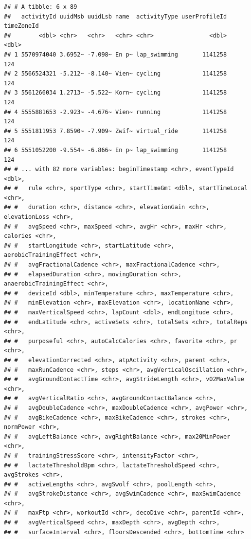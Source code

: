 \documentclass[
]{book}
\newenvironment{Shaded}{\begin{snugshade}}{\end{snugshade}}
\newcommand{\KeywordTok}[1]{\textcolor[rgb]{0.13,0.29,0.53}{\textbf{#1}}}
\newcommand{\NormalTok}[1]{#1}
\newcommand{\OperatorTok}[1]{\textcolor[rgb]{0.81,0.36,0.00}{\textbf{#1}}}
\newcommand{\StringTok}[1]{\textcolor[rgb]{0.31,0.60,0.02}{#1}}
\begin{document}
\begin{Shaded}
\end{Shaded}

\begin{verbatim}
## # A tibble: 6 x 89
##   activityId uuidMsb uuidLsb name  activityType userProfileId timeZoneId
##        <dbl> <chr>   <chr>   <chr> <chr>                <dbl>      <dbl>
## 1 5570974040 3.6952~ -7.098~ En p~ lap_swimming       1141258        124
## 2 5566524321 -5.212~ -8.140~ Vien~ cycling            1141258        124
## 3 5561266034 1.2713~ -5.522~ Korn~ cycling            1141258        124
## 4 5555881653 -2.923~ -4.676~ Vien~ running            1141258        124
## 5 5551811953 7.8590~ -7.909~ Zwif~ virtual_ride       1141258        124
## 6 5551052200 -9.554~ -6.866~ En p~ lap_swimming       1141258        124
## # ... with 82 more variables: beginTimestamp <chr>, eventTypeId <dbl>,
## #   rule <chr>, sportType <chr>, startTimeGmt <dbl>, startTimeLocal <chr>,
## #   duration <chr>, distance <chr>, elevationGain <chr>, elevationLoss <chr>,
## #   avgSpeed <chr>, maxSpeed <chr>, avgHr <chr>, maxHr <chr>, calories <chr>,
## #   startLongitude <chr>, startLatitude <chr>, aerobicTrainingEffect <chr>,
## #   avgFractionalCadence <chr>, maxFractionalCadence <chr>,
## #   elapsedDuration <chr>, movingDuration <chr>, anaerobicTrainingEffect <chr>,
## #   deviceId <dbl>, minTemperature <chr>, maxTemperature <chr>,
## #   minElevation <chr>, maxElevation <chr>, locationName <chr>,
## #   maxVerticalSpeed <chr>, lapCount <dbl>, endLongitude <chr>,
## #   endLatitude <chr>, activeSets <chr>, totalSets <chr>, totalReps <chr>,
## #   purposeful <chr>, autoCalcCalories <chr>, favorite <chr>, pr <chr>,
## #   elevationCorrected <chr>, atpActivity <chr>, parent <chr>,
## #   maxRunCadence <chr>, steps <chr>, avgVerticalOscillation <chr>,
## #   avgGroundContactTime <chr>, avgStrideLength <chr>, vO2MaxValue <chr>,
## #   avgVerticalRatio <chr>, avgGroundContactBalance <chr>,
## #   avgDoubleCadence <chr>, maxDoubleCadence <chr>, avgPower <chr>,
## #   avgBikeCadence <chr>, maxBikeCadence <chr>, strokes <chr>, normPower <chr>,
## #   avgLeftBalance <chr>, avgRightBalance <chr>, max20MinPower <chr>,
## #   trainingStressScore <chr>, intensityFactor <chr>,
## #   lactateThresholdBpm <chr>, lactateThresholdSpeed <chr>, avgStrokes <chr>,
## #   activeLengths <chr>, avgSwolf <chr>, poolLength <chr>,
## #   avgStrokeDistance <chr>, avgSwimCadence <chr>, maxSwimCadence <chr>,
## #   maxFtp <chr>, workoutId <chr>, decoDive <chr>, parentId <chr>,
## #   avgVerticalSpeed <chr>, maxDepth <chr>, avgDepth <chr>,
## #   surfaceInterval <chr>, floorsDescended <chr>, bottomTime <chr>
\end{verbatim}
\end{document}
